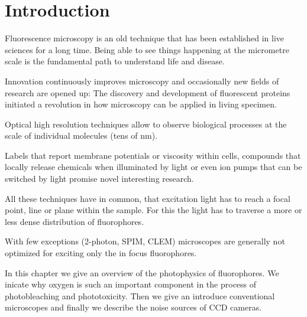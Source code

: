 \chapter{Introduction}
\label{sec:intro}
Fluorescence microscopy is an old technique that has been established
in live sciences for a long time. Being able to see things happening
at the micrometre scale is the fundamental path to understand life and
disease.

Innovation continuously improves microscopy and occasionally new
fields of research are opened up: The discovery and development of
fluorescent proteins initiated a revolution in how microscopy can be
applied in living specimen. 

Optical high resolution techniques allow
to observe biological processes at the scale of individual molecules
(tens of nm). 

Labels that report membrane potentials or viscosity within cells,
compounds that locally release chemicals when illuminated by light or
even ion pumps that can be switched by light promise novel interesting
research.

All these techniques have in common, that excitation light has to
reach a focal point, line or plane within the sample. For this the
light has to traverse a more or less dense distribution of
fluorophores.

With few exceptions (2-photon, SPIM, CLEM) microscopes are generally
not optimized for exciting only the in focus fluorophores.

In this chapter we give an overview of the photophysics of
fluorophores. We inicate why oxygen is such an important component in
the process of photobleaching and phototoxicity.  Then we give an
introduce conventional microscopes and finally we describe the noise
sources of CCD cameras.
